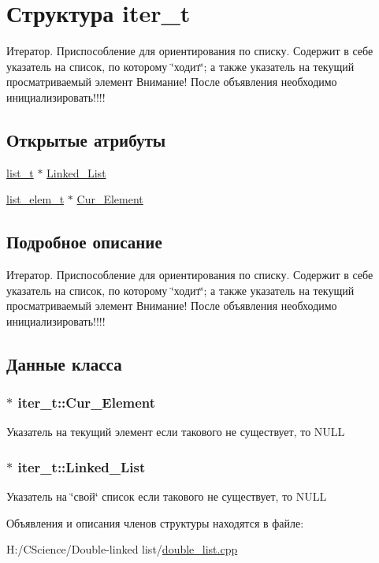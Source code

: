 \hypertarget{structiter__t}{
\section{Структура iter\_\-t}
\label{structiter__t}
}


Итератор. Приспособление для ориентирования по списку. Содержит в себе указатель на список, по которому \char`\"{}ходит\char`\"{}; а также указатель на текущий просматриваемый элемент Внимание! После объявления необходимо инициализировать!!!!  


\subsection*{Открытые атрибуты}
\begin{DoxyCompactItemize}
\item 
\hyperlink{structlist__t}{list\_\-t} $\ast$ \hyperlink{structiter__t_a9579e5e48e0808fc16ad7c58512ba414}{Linked\_\-List}
\item 
\hyperlink{structlist__elem__t}{list\_\-elem\_\-t} $\ast$ \hyperlink{structiter__t_a2360837c619c809b872e7570cb39cb5d}{Cur\_\-Element}
\end{DoxyCompactItemize}


\subsection{Подробное описание}
Итератор. Приспособление для ориентирования по списку. Содержит в себе указатель на список, по которому \char`\"{}ходит\char`\"{}; а также указатель на текущий просматриваемый элемент Внимание! После объявления необходимо инициализировать!!!! 

\subsection{Данные класса}
\hypertarget{structiter__t_a2360837c619c809b872e7570cb39cb5d}{
\subsubsection[{Cur\_\-Element}]{$\ast$ {\bf iter\_\-t::Cur\_\-Element}}}
\label{structiter__t_a2360837c619c809b872e7570cb39cb5d}
Указатель на текущий элемент если такового не существует, то NULL \hypertarget{structiter__t_a9579e5e48e0808fc16ad7c58512ba414}{
\subsubsection[{Linked\_\-List}]{$\ast$ {\bf iter\_\-t::Linked\_\-List}}}
\label{structiter__t_a9579e5e48e0808fc16ad7c58512ba414}
Указатель на \char`\"{}свой\char`\"{} список если такового не существует, то NULL 

Объявления и описания членов структуры находятся в файле:\begin{DoxyCompactItemize}
\item 
H:/CScience/Double-\/linked list/\hyperlink{double__list_8cpp}{double\_\-list.cpp}\end{DoxyCompactItemize}
